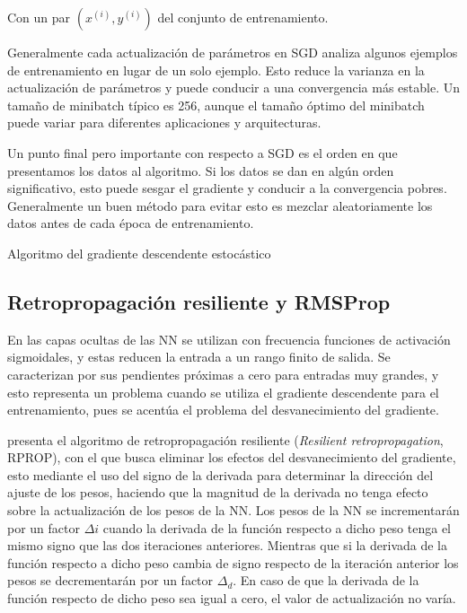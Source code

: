 Con un par $(x^{(i)}, y^{(i)})$ del conjunto de entrenamiento.

Generalmente cada actualización de parámetros en SGD analiza algunos ejemplos de entrenamiento en lugar de un solo ejemplo. Esto reduce la varianza en la actualización de parámetros y puede conducir a una convergencia más estable. Un tamaño de minibatch típico es 256, aunque el tamaño óptimo del minibatch puede variar para diferentes aplicaciones y arquitecturas.

Un punto final pero importante con respecto a SGD es el orden en que presentamos los datos al algoritmo. Si los datos se dan en algún orden significativo, esto puede sesgar el gradiente y conducir a la convergencia pobres. Generalmente un buen método para evitar esto es mezclar aleatoriamente los datos antes de cada época de entrenamiento.

\begin{algorithm}[H]
	\caption{Algoritmo del gradiente descendente estocástico}
	\label{alg:sgd}
\end{algorithm}





\subsection{Retropropagación resiliente y RMSProp}
En las capas ocultas de las NN se utilizan con frecuencia funciones de activación sigmoidales, y estas reducen la entrada a un rango finito de salida. Se caracterizan por sus pendientes próximas a cero para entradas muy grandes, y esto representa un problema cuando se utiliza el gradiente descendente para el entrenamiento, pues se acentúa el problema del desvanecimiento del gradiente.

 presenta el algoritmo de retropropagación resiliente ({\em Resilient retropropagation}, RPROP), con el que busca eliminar los efectos del desvanecimiento del gradiente, esto mediante el uso del signo de la derivada para determinar la dirección del ajuste de los pesos, haciendo que la magnitud de la derivada no tenga efecto sobre la actualización de los pesos de la NN. Los pesos de la NN se incrementarán por un factor $\Delta{i}$ cuando la derivada de la función respecto a dicho peso tenga el mismo signo que las dos iteraciones anteriores. Mientras que si la derivada de la función respecto a dicho peso cambia de signo respecto de la iteración anterior los pesos se decrementarán por un factor $\Delta_{d}$. En caso de que la derivada de la función respecto de dicho peso sea igual a cero, el valor de actualización no varía.

